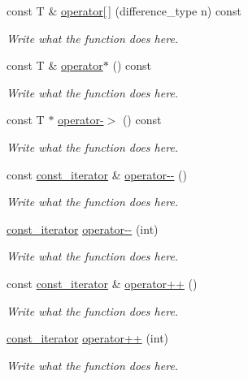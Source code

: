 \begin{DoxyCompactItemize}
\item 
const T \& \hyperlink{classcircularDeque_1_1const__iterator_a0c30a5251f3b952fc2438e3f01c4294f}{operator\mbox{[}$\,$\mbox{]}} (difference\+\_\+type n) const 
\begin{DoxyCompactList}\small\item\em Write what the function does here. \end{DoxyCompactList}\item 
const T \& \hyperlink{classcircularDeque_1_1const__iterator_af221298ee852c28ba884b18bd564c381}{operator$\ast$} () const 
\begin{DoxyCompactList}\small\item\em Write what the function does here. \end{DoxyCompactList}\item 
const T $\ast$ \hyperlink{classcircularDeque_1_1const__iterator_a99a687821e6b8356695374eb60a17644}{operator-\/$>$} () const 
\begin{DoxyCompactList}\small\item\em Write what the function does here. \end{DoxyCompactList}\item 
const \hyperlink{classcircularDeque_1_1const__iterator}{const\+\_\+iterator} \& \hyperlink{classcircularDeque_1_1const__iterator_af3164e3b086675a27892f4de0f5cb07a}{operator-\/-\/} ()
\begin{DoxyCompactList}\small\item\em Write what the function does here. \end{DoxyCompactList}\item 
\hyperlink{classcircularDeque_1_1const__iterator}{const\+\_\+iterator} \hyperlink{classcircularDeque_1_1const__iterator_ae8a986da58f120a06319332eca03c106}{operator-\/-\/} (int)
\begin{DoxyCompactList}\small\item\em Write what the function does here. \end{DoxyCompactList}\item 
const \hyperlink{classcircularDeque_1_1const__iterator}{const\+\_\+iterator} \& \hyperlink{classcircularDeque_1_1const__iterator_a1e1da24d7054467036d20a00c453c219}{operator++} ()
\begin{DoxyCompactList}\small\item\em Write what the function does here. \end{DoxyCompactList}\item 
\hyperlink{classcircularDeque_1_1const__iterator}{const\+\_\+iterator} \hyperlink{classcircularDeque_1_1const__iterator_a58909e8bf739c88361ba315c0b2e8e23}{operator++} (int)
\begin{DoxyCompactList}\small\item\em Write what the function does here. \end{DoxyCompactList}\end{DoxyCompactItemize}
